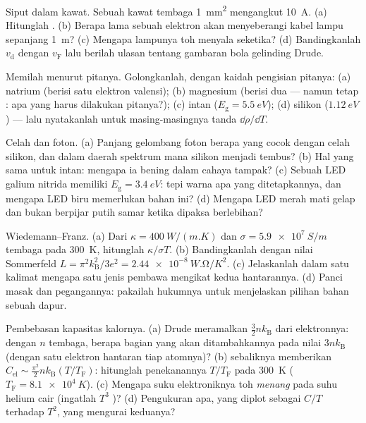 \begin{exercise}[$\star$]\label{exo:b3:electrons-in-solids:2}
Siput dalam kawat. Sebuah kawat tembaga \qty{1}{mm^2} mengangkut
\qty{10}{A}. (a) Hitunglah . (b) Berapa lama
sebuah elektron akan menyeberangi kabel lampu sepanjang \qty{1}{m}? (c) Mengapa
lampunya toh menyala seketika? (d) Bandingkanlah
$v_{\text{d}}$ dengan $v_{\text{F}}$ lalu berilah ulasan tentang gambaran
bola gelinding Drude.
\end{exercise}

\begin{exercise}[$\star$]\label{exo:b3:electrons-in-solids:3}
Memilah menurut pitanya. Golongkanlah, dengan kaidah pengisian pitanya: (a)
natrium (berisi satu elektron valensi); (b) magnesium (berisi dua --- namun
tetap : apa yang harus dilakukan pitanya?); (c) intan
($E_{\text{g}} = \qty{5.5}{eV}$); (d) silikon
($\qty{1.12}{eV}$) --- lalu nyatakanlah untuk masing-masingnya tanda
$\dd\rho/\dd T$.
\end{exercise}

\begin{exercise}[$\star$]\label{exo:b3:electrons-in-solids:4}
Celah dan foton. (a) Panjang gelombang foton berapa yang cocok dengan
celah silikon, dan dalam daerah spektrum mana silikon menjadi
tembus? (b) Hal yang sama untuk intan: mengapa ia bening dalam
cahaya tampak? (c) Sebuah LED galium nitrida memiliki $E_{\text{g}} =
\qty{3.4}{eV}$: tepi warna apa yang ditetapkannya, dan mengapa LED biru
memerlukan bahan ini? (d) Mengapa LED merah mati gelap dan bukan
berpijar putih samar ketika dipaksa berlebihan?
\end{exercise}

\begin{exercise}[$\star\star$]\label{exo:b3:electrons-in-solids:5}
Wiedemann--Franz. (a) Dari $\kappa =
\qty{400}{W/(m.K)}$ dan $\sigma = \qty{5.9e7}{S/m}$ tembaga pada
\qty{300}{K}, hitunglah $\kappa/\sigma T$. (b) Bandingkanlah dengan
nilai Sommerfeld $L = \pi^2k_{\text{B}}^2/3e^2 =
\qty{2.44e-8}{W.\ohm/K^2}$. (c) Jelaskanlah dalam satu kalimat mengapa satu
jenis pembawa mengikat kedua hantarannya. (d) Panci masak
dan pegangannya: pakailah hukumnya untuk menjelaskan pilihan bahan sebuah dapur.
\end{exercise}

\begin{exercise}[$\star\star$]\label{exo:b3:electrons-in-solids:6}
Pembebasan kapasitas kalornya. (a) Drude meramalkan
$\tfrac32nk_{\text{B}}$ dari elektronnya: dengan $n$ tembaga,
berapa bagian yang akan ditambahkannya pada nilai 
$3nk_{\text{B}}$ (dengan satu elektron hantaran tiap atomnya)? (b)
 sebaliknya memberikan $C_{\text{el}}
\sim \tfrac{\pi^2}{2}nk_{\text{B}}(T/T_{\text{F}})$: hitunglah
penekanannya $T/T_{\text{F}}$ pada \qty{300}{K}
($T_{\text{F}} = \qty{8.1e4}{K}$). (c) Mengapa suku elektroniknya
toh \emph{menang} pada suhu helium cair
(ingatlah $T^3$ )? (d) Pengukuran apa, yang diplot sebagai
$C/T$ terhadap $T^2$, yang mengurai keduanya?
\end{exercise}


